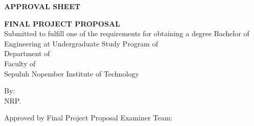 \begin{center}
  \large
  \textbf{APPROVAL SHEET}
\end{center}

\thispagestyle{empty}

\begin{center}
  \textbf{\engtatitle{}}
\end{center}

\begingroup
\small

\begin{center}
  \textbf{FINAL PROJECT PROPOSAL} \\
  Submitted to fulfill one of the requirements for obtaining a degree
  Bachelor of Engineering at
  Undergraduate Study Program of \studyprogram{} \\
  Department of \engdepartment{} \\
  Faculty of \engfaculty{} \\
  Sepuluh Nopember Institute of Technology
\end{center}

\begin{center}
  By: \textbf{\name} \\
  NRP. \nrp{}
\end{center}

\begin{center}
  Approved by Final Project Proposal Examiner Team:
\end{center}

\begingroup
\setlength{\tabcolsep}{0pt}

